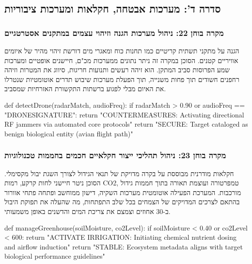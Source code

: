 \documentclass{hebrew-academic-template}
\begin{document}
\subsection{סדרה ד': מערכות אבטחה, חקלאות ומערכות ציבוריות}

\subsubsection{מקרה בוחן 22: ניהול מערכות הגנה וזיהוי עצמים במתקנים אסטרטגיים}
הגנה על מתקני תשתית קריטיים כמו תחנות כוח ומאגרי מים דורשת זיהוי מהיר של איומים אוויריים קטנים. הסוכן במקרה זה ניתר נתונים ממערכות מכ"ם, חיישנים אופטיים ומערכות שמע הפרוסות סביב המתקן. הוא זיהה רעשים ותנועות חריגות, סיווג את המטרות וזיהה רחפנים חשודים תוך פחות משנייה, תוך הפעלת מערכות שיבוש תדרים אוטומטיות שנטרלו את האיום מבלי לפגוע ברשתות התקשורת האזרחיות שמסביב.
\begin{pythonbox}
def detectDrone(radarMatch, audioFreq):
    if radarMatch > 0.90 or audioFreq == "DRONESIGNATURE":
        return "COUNTERMEASURES: Activating directional RF jammers via automated core protocols"
    return "SECURE: Target cataloged as benign biological entity (avian flight path)"
\end{pythonbox}

\subsubsection{מקרה בוחן 23: ניהול תהליכי ייצור חקלאיים חכמים בחממות טכנולוגיות}
חקלאות מודרנית מבוססת על בקרה מדויקת של תנאי הגידול לצורך השגת יבול מקסימלי. הסוכן ניטר חיישני לחות קרקע, רמות CO2, טמפרטורה ועוצמת תאורה בתוך חממות גידול מורכבות. המערכת הפעילה אוטומטית מערכות השקיה, דישון ממוחשב ופתחה פתחי אוורור בהתאם לצרכים המדויקים של הצמחים בכל שלב התפתחות, מה שהעלה את תפוקת היבול ב-30 אחוזים וצמצם את צריכת המים והדשנים באופן משמעותי.
\begin{pythonbox}
def manageGreenhouse(soilMoisture, co2Level):
    if soilMoisture < 0.40 or co2Level < 600:
        return "ACTIVATE IRRIGATION: Initiating chemical nutrient dosing and airflow induction"
    return "STABLE: Ecosystem metadata aligns with target biological performance guidelines"
\end{pythonbox}
\end{document}
